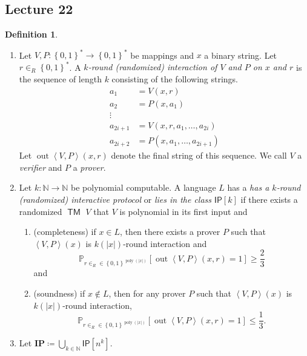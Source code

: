 \documentclass[10pt,letterpaper,cm]{nupset}
\theoremstyle{definition}
\newtheorem{definition}{Definition}[subsection]
\theoremstyle{theorem}
\theoremstyle{remark}
\newcommand{\N}{\mathbb N}
\newcommand{\1}{\mathbf{1}}
\newcommand{\0}{\vec 0}
\DeclareMathOperator{\out}{out}
\DeclareMathOperator{\TM}{\mathsf{TM}}
\DeclareMathOperator{\poly}{poly}
\begin{document}
\subsection{Lecture 22}

\begin{definition} $ $
\begin{enumerate}
\item  Let $V, P: \left\{0,1\right\}^{\ast} \to \left\{0,1\right\}^{\ast}$ be mappings and $x$ a binary string. Let $r\in_R \left\{0,1\right\}^{\ast}$. A \textit{$k$-round (randomized) interaction of $V$ and $P$ on $x$ and $r$} is the sequence of length $k$  consisting of the following strings.
\[
\begin{aligned} a_{1} &=V(x, r) \\ a_{2} &=P\left(x, a_{1}\right) \\ \vdots & \\ a_{2 i+1} &=V\left(x,r, a_{1}, \ldots, a_{2 i}\right) \\ a_{2 i+2} &=P\left(x, a_{1}, \ldots, a_{2 i+1}\right) \end{aligned}
\] Let $\out{\left\langle V, P\right\rangle (x, r)}$ denote the final string of this sequence. We call $V$ a \textit{verifier} and $P$ a \textit{prover}.
\item Let $k : \N \to \N$ be polynomial computable. A language $L$ has a \textit{has a $k$-round (randomized) interactive protocol} or \textit{lies in the class $\mathsf{IP}[k]$} if there exists a randomized $\TM$ $V$ that $V$ is polynomial in its first input and
\begin{enumerate}
\item (completeness) if $x\in L$, then there exists a prover $P$ such that $\left\langle V, P\right\rangle(x)$ is $k(\left\lvert{x}\right\rvert)$-round interaction and $$\mathbb{P}_{r\in_R \in \left\{0,1\right\}^{\poly(\left\lvert{x}\right\rvert)}}\left[\out{\left\langle V, P\right\rangle(x, r)} =1\right] \geq \frac{2}{3}$$ and 
\item (soundness) if $x\notin L$, then for any prover $P$ such that $\left\langle V, P\right\rangle(x)$ is $k(\left\lvert{x}\right\rvert)$-round interaction, $$\mathbb{P}_{r\in_R \in \left\{0,1\right\}^{\poly(\left\lvert{x}\right\rvert)}}\left[\out{\left\langle V, P\right\rangle(x, r)} =1\right] \leq \frac{1}{3}.$$
\end{enumerate}
\item Let $\mathbf{IP} \coloneqq \bigcup_{k\in \N}\mathsf{IP}\left[n^k\right]$.
\end{enumerate}
\end{definition}
\end{document}
